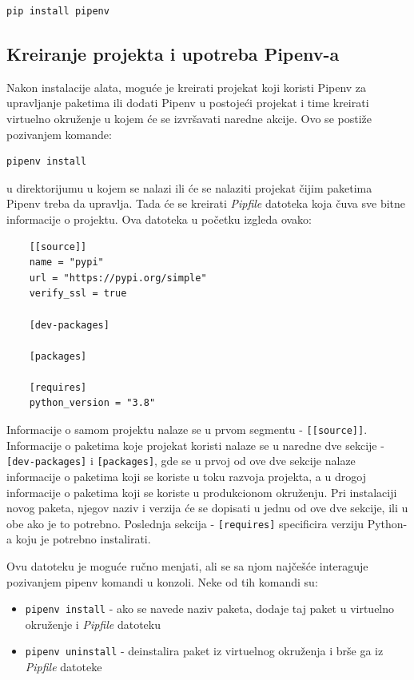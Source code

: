 \documentclass[12pt]{report}
\begin{document}
\begin{verbatim}
pip install pipenv
\end{verbatim}

\subsection{Kreiranje projekta i upotreba Pipenv-a}

Nakon instalacije alata, moguće je kreirati projekat koji koristi Pipenv za upravljanje paketima ili dodati Pipenv u postojeći projekat i time kreirati virtuelno okruženje u kojem će se izvršavati naredne akcije. Ovo se postiže pozivanjem komande:

\begin{verbatim}
pipenv install
\end{verbatim}

u direktorijumu u kojem se nalazi ili će se nalaziti projekat čijim paketima Pipenv treba da upravlja. Tada će se kreirati \textit{Pipfile} datoteka koja čuva sve bitne informacije o projektu. Ova datoteka u početku izgleda ovako:

\begin{samepage}
    \begin{verbatim}
    [[source]]
    name = "pypi"
    url = "https://pypi.org/simple"
    verify_ssl = true

    [dev-packages]

    [packages]

    [requires]
    python_version = "3.8"
    \end{verbatim}
\end{samepage}

Informacije o samom projektu nalaze se u prvom segmentu - \texttt{[[source]]}. Informacije o paketima koje projekat koristi nalaze se u naredne dve sekcije - \texttt{[dev-packages]} i \texttt{[packages]}, gde se u prvoj od ove dve sekcije nalaze informacije o paketima koji se koriste u toku razvoja projekta, a u drogoj informacije o paketima koji se koriste u produkcionom okruženju. Pri instalaciji novog paketa, njegov naziv i verzija će se dopisati u jednu od ove dve sekcije, ili u obe ako je to potrebno. Poslednja sekcija - \texttt{[requires]} specificira verziju Python-a koju je potrebno instalirati.

Ovu datoteku je moguće ručno menjati, ali se sa njom najčešće interaguje pozivanjem pipenv komandi u konzoli. Neke od tih komandi su:

\begin{itemize}
    \item \texttt{pipenv install} - ako se navede naziv paketa, dodaje taj paket u virtuelno okruženje i \textit{Pipfile} datoteku
    \item \texttt{pipenv uninstall} - deinstalira paket iz virtuelnog okruženja i brše ga iz \textit{Pipfile} datoteke
\end{itemize}
\end{document}
